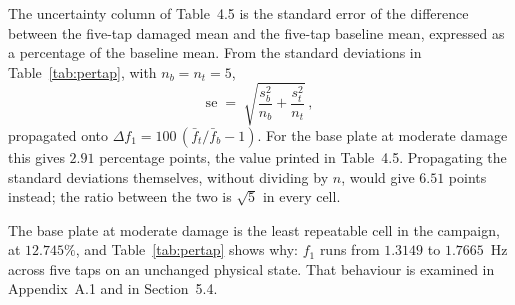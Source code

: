 The uncertainty column of Table~4.5 is the standard error of the difference
between the five-tap damaged mean and the five-tap baseline mean, expressed as a
percentage of the baseline mean. From the standard deviations in
Table~\ref{tab:pertap}, with $n_b = n_t = 5$,
%
\begin{equation*}
  \mathrm{se} \;=\;
  \sqrt{\frac{s_b^{2}}{n_b} + \frac{s_t^{2}}{n_t}} \, ,
\end{equation*}
%
propagated onto $\Delta f_1 = 100\,(\bar f_t/\bar f_b - 1)$. For the base plate at
moderate damage this gives $2.91$ percentage points, the value printed in
Table~4.5. Propagating the standard deviations themselves, without dividing by
$n$, would give $6.51$ points instead; the ratio between the two is $\sqrt{5}$ in
every cell.

The base plate at moderate damage is the least repeatable cell in the campaign,
at $12.745\%$, and Table~\ref{tab:pertap} shows why: $f_1$ runs from $1.3149$ to
$1.7665$~Hz across five taps on an unchanged physical state. That behaviour is
examined in Appendix~A.1 and in Section~5.4.
